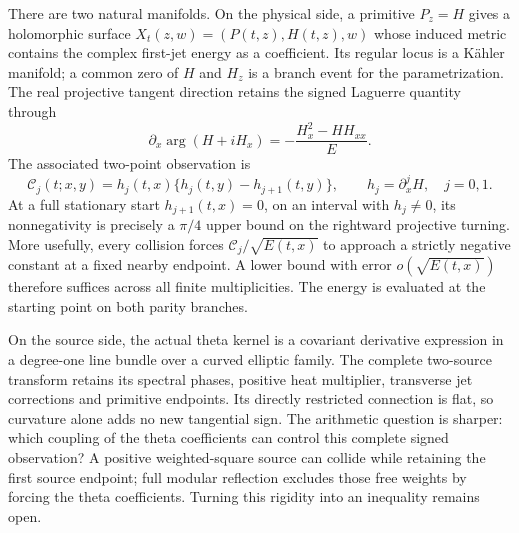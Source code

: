 \documentclass[11pt]{article}
\numberwithin{equation}{section}
\theoremstyle{definition}
\theoremstyle{remark}
\begin{document}
There are two natural manifolds.  On the physical side, a primitive
$P_z=H$ gives a holomorphic surface
$X_t(z,w)=(P(t,z),H(t,z),w)$ whose induced metric contains the complex
first-jet energy as a coefficient.  Its regular locus is a K\"ahler
manifold; a common zero of $H$ and $H_z$ is a branch event for the
parametrization.  The real projective tangent direction retains the
signed Laguerre quantity through
\[
 \partial_x\arg(H+iH_x)=-\frac{H_x^2-HH_{xx}}{E}.
\]
The associated two-point observation is
\[
 \mathcal C_j(t;x,y)=h_j(t,x)\{h_j(t,y)-h_{j+1}(t,y)\},
 \qquad h_j=\partial_x^jH,\quad j=0,1.
\]
At a full stationary start $h_{j+1}(t,x)=0$, on an interval with
$h_j\ne0$, its nonnegativity is precisely a $\pi/4$ upper bound on
the rightward projective turning. More usefully, every collision forces
$\mathcal C_j/\sqrt{E(t,x)}$ to approach a strictly negative constant
at a fixed nearby endpoint. A lower bound with error
$o(\sqrt{E(t,x)})$ therefore suffices across all finite multiplicities.
The energy is evaluated at the starting point on both parity branches.

On the source side, the actual theta kernel is a covariant derivative
expression in a degree-one line bundle over a curved elliptic family.
The complete two-source transform retains its spectral phases, positive
heat multiplier, transverse jet corrections and primitive endpoints.
Its directly restricted connection is flat, so curvature alone adds no
new tangential sign. The arithmetic question is sharper: which coupling
of the theta coefficients can control this complete signed observation?
A positive weighted-square source can collide while retaining the first
source endpoint; full modular reflection excludes those free weights
by forcing the theta coefficients. Turning this rigidity into an
inequality remains open.
\end{document}
